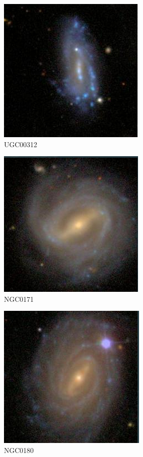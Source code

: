 \documentclass[9pt]{revtex4-1}
\begin{document}
\begin{figure}
\includegraphics[scale=0.3]{UGC00312.png}
\caption{UGC00312}
\end{figure}
\begin{figure}
\includegraphics[scale=0.3]{NGC0171.png}
\caption{NGC0171}
\end{figure}
\begin{figure}
\includegraphics[scale=0.3]{NGC0180.png}
\caption{NGC0180}
\end{figure}

\end{document}
